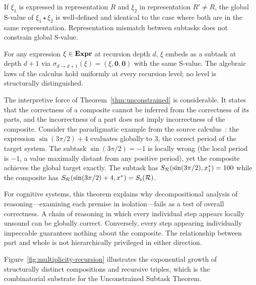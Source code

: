 \begin{corollary}\label{cor:apples-oranges}
If $\xi_1$ is expressed in representation $R$ and $\xi_2$ in representation $R' \neq R$, the global S-value of $\xi_1 \star \xi_2$ is well-defined and identical to the case where both are in the same representation. Representation mismatch between subtasks does not constrain global S-value.
\end{corollary}

\begin{theorem}\label{thm:no-priv-level}
For any expression $\xi \in \mathbf{Expr}$ at recursion depth $d$, $\xi$ embeds as a subtask at depth $d+1$ via $\sigma_{d \to d+1}(\xi) = (\xi, \mathbf{0}, \mathbf{0})$ with the same S-value. The algebraic laws of the calculus hold uniformly at every recursion level; no level is structurally distinguished.
\end{theorem}

The interpretive force of Theorem~\ref{thm:unconstrained} is considerable. It states that the correctness of a composite cannot be inferred from the correctness of its parts, and the incorrectness of a part does not imply incorrectness of the composite. Consider the paradigmatic example from the source calculus~\citep{sachikonye2024_subtask}: the expression $\sin(3\pi/2) + 4$ evaluates globally to $3$, the correct period of the target system. The subtask $\sin(3\pi/2) = -1$ is locally wrong (the local period is $-1$, a value maximally distant from any positive period), yet the composite achieves the global target exactly. The subtask has $S_{\mathcal{R}}(\sin(3\pi/2), x^*_1) = 100$ while the composite has $S_{\mathcal{R}}(\sin(3\pi/2) + 4, x^*) = S_{\flat}(\mathcal{R})$.

For cognitive systems, this theorem explains why decompositional analysis of reasoning---examining each premise in isolation---fails as a test of overall correctness. A chain of reasoning in which every individual step appears locally unsound can be globally correct. Conversely, every step appearing individually impeccable guarantees nothing about the composite. The relationship between part and whole is not hierarchically privileged in either direction.

Figure~\ref{fig:multiplicity-recursion} illustrates the exponential growth of structurally distinct compositions and recursive triples, which is the combinatorial substrate for the Unconstrained Subtask Theorem.

